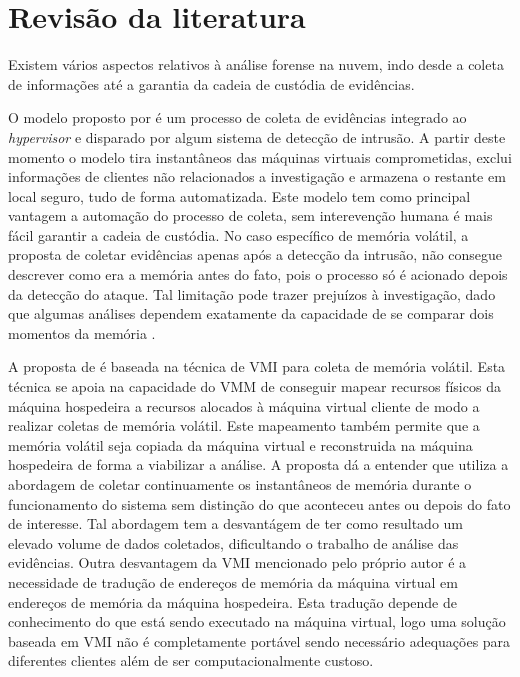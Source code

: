 \chapter{Revisão da literatura}
\label{chp:revisão}


Existem vários aspectos relativos à análise forense na nuvem, indo desde a coleta de informações até a garantia da cadeia de custódia de evidências.

%
O modelo proposto por \cite{ReichertAutoAcquisition:2015} é um processo de coleta de evidências integrado ao \textit{hypervisor} e disparado por algum sistema de detecção de intrusão. 
%
A partir deste momento o modelo tira instantâneos das máquinas virtuais comprometidas, exclui informações de clientes não relacionados a investigação e armazena o restante em local seguro, tudo de forma automatizada. 
%
Este modelo tem como principal vantagem a automação do processo de coleta, sem interevenção humana é mais fácil garantir a cadeia de custódia. 
%
No caso específico de memória volátil, a proposta de coletar evidências apenas após a detecção da intrusão, não consegue descrever como era a memória antes do fato, pois o processo só é acionado depois da detecção do ataque.
%
Tal limitação pode trazer prejuízos à investigação, dado que algumas análises dependem exatamente da capacidade de se comparar dois momentos da memória \cite{CaseMemoryForensics:2014}. 
% 

A proposta de \cite{PoiselVMI:2013} é baseada na técnica de VMI para coleta de memória volátil. 
%
Esta técnica se apoia na capacidade do VMM de conseguir mapear recursos físicos da máquina hospedeira a recursos alocados à máquina virtual cliente de modo a realizar coletas de memória volátil.
%
Este mapeamento também permite que a memória volátil seja copiada da máquina virtual e reconstruida na máquina hospedeira de forma a viabilizar a análise.
%
A proposta dá a entender que utiliza a abordagem de coletar continuamente os instantâneos de memória durante o funcionamento do sistema sem distinção do que aconteceu antes ou depois do fato de interesse. 
%
Tal abordagem tem a desvantágem de ter como resultado um elevado volume de dados coletados, dificultando o trabalho de análise das evidências.
%
Outra desvantagem da VMI mencionado pelo próprio autor é a necessidade de tradução de endereços de memória da máquina virtual em endereços de memória da máquina hospedeira.
%
Esta tradução depende de conhecimento do que está sendo executado na máquina virtual, logo uma solução baseada em VMI não é completamente portável sendo necessário adequações para diferentes clientes além de ser computacionalmente custoso.
%

